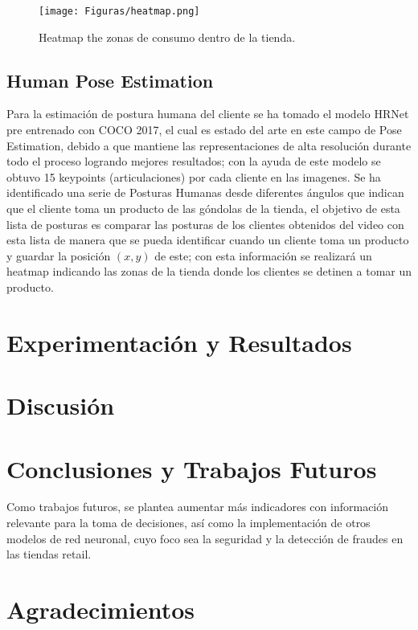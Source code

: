 \documentclass[conference]{IEEEtran}
\begin{document}
\begin{figure}[hbtp]
\centering
\texttt{[image: Figuras/heatmap.png]}
\caption{Heatmap the zonas de consumo dentro de la tienda.}
\label{fig:heatmap}
\end{figure}

\subsection{Human Pose Estimation}
Para la estimación de postura humana del cliente se ha tomado el modelo HRNet \cite{sun2019deep} pre entrenado con COCO 2017, el cual es estado del arte en este campo de Pose Estimation, debido a que mantiene las representaciones de alta resolución durante todo el proceso logrando mejores resultados; con la ayuda de este modelo se obtuvo 15 keypoints (articulaciones) por cada cliente en las imagenes.
Se ha identificado una serie de Posturas Humanas desde diferentes ángulos que indican que el cliente toma un producto de las góndolas de la tienda, el objetivo de esta lista de posturas es comparar las posturas de los clientes obtenidos del video con esta lista de manera que se pueda identificar cuando un cliente toma un producto y guardar la posición $(x, y)$ de este; con esta información se realizará un heatmap indicando las zonas de la tienda donde los clientes se detinen a tomar un producto.

\section{Experimentación y Resultados}

\section{Discusión}

\section{Conclusiones y Trabajos Futuros}

Como trabajos futuros, se plantea aumentar más indicadores con información relevante para la toma de decisiones, así como la implementación de otros modelos de red neuronal, cuyo foco sea la seguridad y la detección de fraudes en las tiendas retail.

\section*{Agradecimientos}



\end{document}
